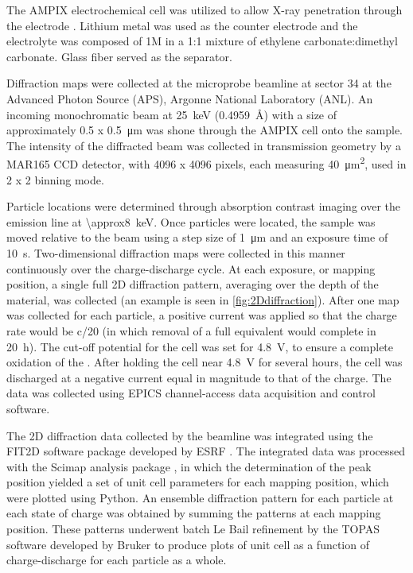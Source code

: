 \documentclass{article}
\begin{document}
The AMPIX electrochemical cell was utilized to allow X-ray penetration
through the electrode \cite{borkiewicz2012}. Lithium metal was used as
the counter electrode and the electrolyte was composed of 1M
 in a 1:1 mixture of ethylene carbonate:dimethyl
carbonate. Glass fiber served as the separator.

Diffraction maps were collected at the microprobe beamline at sector
34 at the Advanced Photon Source (APS), Argonne National Laboratory
(ANL). An incoming monochromatic beam at \SI{25}{\kilo\electronvolt}
(\SI{0.4959}{\angstrom}) with a size of approximately 0.5 x
\SI{0.5}{\micro\meter} was shone through the AMPIX cell onto the
sample. The intensity of the diffracted beam was collected in
transmission geometry by a MAR165 CCD detector, with 4096 x 4096
pixels, each measuring \SI{40}{\square\micro\meter}, used in 2 x 2
binning mode.

Particle locations were determined through absorption contrast imaging
over the  emission line at
\SI{\approx8}{\kilo\electronvolt}. Once particles were located, the
sample was moved relative to the beam using a step size of
\SI{1}{\micro\meter} and an exposure time of
\SI{10}{\second}. Two-dimensional diffraction maps were collected in
this manner continuously over the charge-discharge cycle. At each
exposure, or mapping position, a single full 2D diffraction pattern,
averaging over the depth of the material, was collected (an example is
seen in \ref{fig:2Ddiffraction}). After one map was collected for each
particle, a positive current was applied so that the charge rate would
be c/20 (in which removal of a full  equivalent would complete
in \SI{20}{\hour}). The cut-off potential for the cell was set for
\SI{4.8}{\volt}, to ensure a complete oxidation of the \nca{}. After
holding the cell near \SI{4.8}{\volt} for several hours, the cell was
discharged at a negative current equal in magnitude to that of the
charge. The data was collected using EPICS channel-access data
acquisition and control software.

The 2D diffraction data collected by the beamline was integrated using
the FIT2D software package developed by ESRF \cite{Hammersley1996,
  Hammersley1997}. The integrated data was processed with the Scimap
analysis package \cite{Wolfman2015}, in which the determination of the
peak position yielded a set of unit cell parameters for each mapping
position, which were plotted using Python. An ensemble diffraction
pattern for each particle at each state of charge was obtained by
summing the patterns at each mapping position. These patterns
underwent batch Le Bail refinement by the TOPAS software developed by
Bruker to produce plots of unit cell as a function of charge-discharge
for each particle as a whole.
\end{document}
